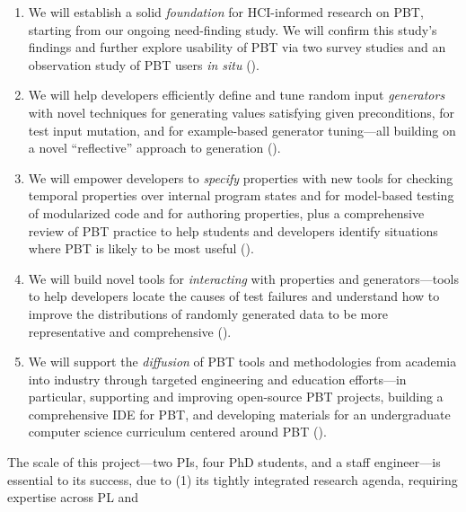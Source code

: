 \begin{enumerate}[noitemsep]
\item We will establish a solid \emph{foundation} for HCI-informed research on PBT,
starting from our ongoing need-finding study. We will confirm
this study's findings and further explore usability of PBT via
two survey studies and an observation study
of PBT users {\em in situ} ().
%
\item We will help developers efficiently define and tune random input
\emph{generators} with novel techniques for generating values
satisfying given preconditions, for test input mutation, and for
example-based generator tuning---all building on a novel
``reflective'' approach to generation ().
%
\item We will empower developers to \emph{specify} properties with new
tools for checking temporal properties over internal program states
and for model-based testing of modularized code and for authoring
properties, plus a comprehensive review of PBT practice to help
students and developers identify situations where PBT is likely to be
most useful ().
%
\item We will build novel tools for {\em interacting} with properties
and generators---tools to help developers locate the causes of test
failures and understand how to improve the distributions of randomly
generated data to be more representative and
comprehensive\iflater{}\fi{} ().
%
\item We will support the {\em diffusion} of PBT tools and
methodologies from academia into industry through targeted engineering
and education efforts---in particular, supporting and
improving open-source PBT projects, building a
comprehensive IDE for PBT, and developing materials for an
undergraduate computer science curriculum centered around PBT
().  \iflater{}\fi
\end{enumerate}
%
The scale of this project---two PIs, four PhD students, and a staff
engineer---is essential to its success, due to (1) its
tightly integrated research agenda, requiring expertise across PL and
